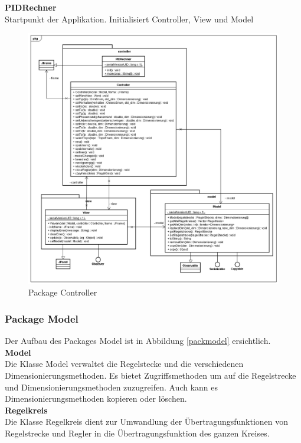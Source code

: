 \textbf{PIDRechner}\\
Startpunkt der Applikation. Initialisiert Controller, View und Model

\begin{figure}[p]
\centering
\includegraphics[width=1\textwidth]{packcontrl.png}
\caption{Package Controller}
\label{packcontrl}
\end{figure}

\newpage
\subsubsection{Package Model}
Der Aufbau des Packages Model ist in Abbildung \ref{packmodel} ersichtlich.\\

\textbf{Model}\\
Die Klasse Model verwaltet die Regelstecke und die verschiedenen Dimensionierungsmethoden. Es bietet Zugriffsmethoden um auf die Regelstrecke und Dimensionierungsmethoden zuzugreifen. Auch kann es Dimensionierungsmethoden kopieren oder löschen.\\

\textbf{Regelkreis}\\
Die Klasse Regelkreis dient zur Umwandlung der Übertragungsfunktionen von Regelstrecke und Regler in die Übertragungsfunktion des ganzen Kreises.\\

